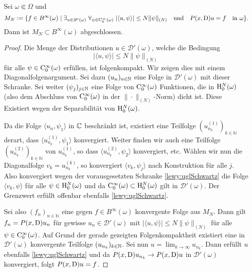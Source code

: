 \begin{lem}\label{lm:closed}
Sei $\omega\Subset\Omega$ und
\begin{equation}
M_N:= \{f\in B^\infty(\omega)\mid \exists_{u\in\mathscr D'(\omega)}\; \forall_{\psi\in\mathrm C_0^\infty(\omega)}\; |\langle u,\psi\rangle | \le N \|\psi\|_{(N)} \quad\text{und}\quad P(x,\mathrm{D})u=f\quad \text{in $\omega$} \}.
\end{equation}
Dann ist $M_N\subset B^\infty(\omega)$ abgeschlossen.
\end{lem}

\begin{proof}
Die Menge der Distributionen $u\in\mathscr D'(\omega)$, welche die  Bedingung 
\begin{equation}\label{lewy:uglSchwartz}
|\langle u,\psi\rangle|\leq N\|\psi\|_{(N)} 
\end{equation}
für alle $\psi\in\mathrm C_0^\infty(\omega)$ erfüllen, ist folgenkompakt. Wir zeigen dies mit einem Diagonalfolgenargument.
Sei dazu $(u_n)_{n\in\mathbb N}$ eine Folge in $\mathscr D'(\omega)$ mit dieser Schranke. Sei weiter $(\psi_j)_{j\in\mathbb N}$ eine Folge
von $\mathrm C_0^\infty(\omega)$ Funktionen, die in $\mathrm H^N_0(\omega)$ (also dem Abschluss von $\mathrm C_0^\infty(\omega)$ in der $\|\cdot\|_{(N)}$-Norm) dicht ist.
Diese Existiert wegen der Separabilität von $\mathrm H_0^N(\omega)$.

Da die Folge $\langle u_n,\psi_1\rangle$ in $\mathbb C$ beschränkt ist, existiert eine Teilfolge $(u_{n_k}^{(1)})_{k\in\mathbb{N}}$ derart, dass
$\langle u_{n_k}^{(1)},\psi_1\rangle$ konvergiert. Weiter finden wir auch eine Teilfolge $(u_{n_k}^{(2)})_{k\in\mathbb{N}}$ von $u_{n_k}^{(1)}$, so dass $\langle u_{n_k}^{(2)},\psi_2\rangle$ konvergiert, etc. Wählen wir nun die Diagonalfolge $v_k = u_{n_k}^{(k)}$, so konvergiert $\langle v_k,\psi_j\rangle$ nach Konstruktion für alle $j$. 
Also konvergiert wegen der vorausgesetzten Schranke \eqref{lewy:uglSchwartz} die Folge   $\langle v_k,\psi\rangle$  für alle $\psi\in\mathrm H^N_0(\omega)$ und da $\mathrm C_0^\infty(\omega)\subset \mathrm H_0^N(\omega)$ gilt in $\mathscr D'(\omega)$. Der Grenzwert erfüllt offenbar ebenfalls \eqref{lewy:uglSchwartz}.

Sei also $(f_n)_{n\in\mathbb{N}}$ eine gegen $f\in B^\infty(\omega)$ konvergente Folge aus $M_N$. Dann gilt  $f_n=P(x,\mathrm D)u_n$ für gewisse $u_n\in\mathscr{D}'(\omega)$ mit  $|\langle u,\psi\rangle | \le N \|\psi\|_{(N)}$ für alle $\psi\in\mathrm C_0^\infty(\omega)$. Auf Grund der gerade gezeigten Folgenkompaktheit existiert eine in $\mathscr D'(\omega)$  konvergente Teilfolge $(u_{n_k})_{k\in\mathbb N}$. Sei nun $u=\lim_{k\rightarrow\infty}u_{n_k}$. Dann erfüllt $u$ ebenfalls  
 \eqref{lewy:uglSchwartz} und da $P(x,\mathrm D)u_{n_k}\to P(x,\mathrm D)u$ in $\mathscr D'(\omega)$ konvergiert, folgt $P(x,\mathrm D)u=f$.
\end{proof}
